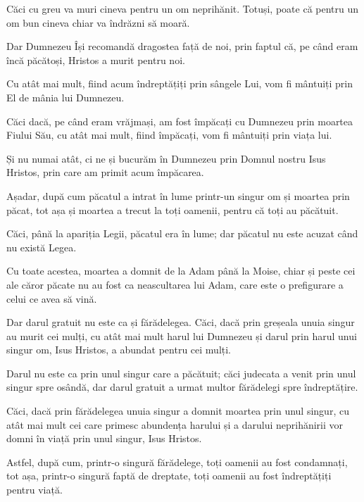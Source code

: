 {Căci cu greu va muri cineva pentru un om neprihănit. Totuși, poate că pentru un om bun cineva chiar va îndrăzni să moară.

Dar Dumnezeu Își recomandă dragostea față de noi, prin faptul că, pe când eram încă păcătoși, Hristos a murit pentru noi.


\par }{\PP {}Cu atât mai mult, fiind acum îndreptățiți prin sângele Lui, vom fi mântuiți prin El de mânia lui Dumnezeu.

Căci dacă, pe când eram vrăjmași, am fost împăcați cu Dumnezeu prin moartea Fiului Său, cu atât mai mult, fiind împăcați, vom fi mântuiți prin viața lui.


\par }{\PP {}Și nu numai atât, ci ne și bucurăm în Dumnezeu prin Domnul nostru Isus Hristos, prin care am primit acum împăcarea.

Așadar, după cum păcatul a intrat în lume printr-un singur om și moartea prin păcat, tot așa și moartea a trecut la toți oamenii, pentru că toți au păcătuit.

Căci, până la apariția Legii, păcatul era în lume; dar păcatul nu este acuzat când nu există Legea.

Cu toate acestea, moartea a domnit de la Adam până la Moise, chiar și peste cei ale căror păcate nu au fost ca neascultarea lui Adam, care este o prefigurare a celui ce avea să vină.


\par }{\PP {}Dar darul gratuit nu este ca și fărădelegea. Căci, dacă prin greșeala unuia singur au murit cei mulți, cu atât mai mult harul lui Dumnezeu și darul prin harul unui singur om, Isus Hristos, a abundat pentru cei mulți.

Darul nu este ca prin unul singur care a păcătuit; căci judecata a venit prin unul singur spre osândă, dar darul gratuit a urmat multor fărădelegi spre îndreptățire.

Căci, dacă prin fărădelegea unuia singur a domnit moartea prin unul singur, cu atât mai mult cei care primesc abundența harului și a darului neprihănirii vor domni în viață prin unul singur, Isus Hristos.


\par }{\PP {}Astfel, după cum, printr-o singură fărădelege, toți oamenii au fost condamnați, tot așa, printr-o singură faptă de dreptate, toți oamenii au fost îndreptățiți pentru viață.

}
